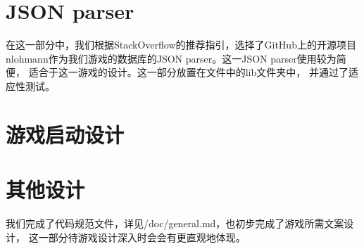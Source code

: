 \documentclass[UTF8]{ctexart}
\begin{document}
    \section{JSON parser}
    在这一部分中，我们根据StackOverflow的推荐指引，选择了GitHub上的开源项目
    nlohmann作为我们游戏的数据库的JSON parser。这一JSON parser使用较为简便，
    适合于这一游戏的设计。这一部分放置在文件中的lib文件夹中，
    并通过了适应性测试。

    \section{游戏启动设计}
        
    \section{其他设计}
    我们完成了代码规范文件，详见/doc/general.md，也初步完成了游戏所需文案设计，
    这一部分待游戏设计深入时会会有更直观地体现。
\end{document}
